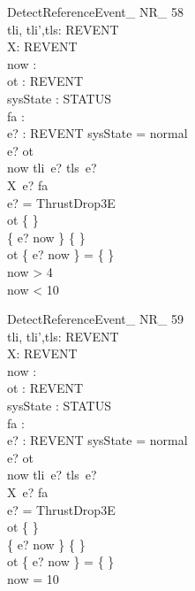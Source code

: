 \begin{schema}{DetectReferenceEvent\_ NR\_ 58}\\
tli, tli',tls: REVENT \fun \nat \\
X: REVENT \fun \nat \\
 now : \nat \\
 ot : REVENT \pfun \nat \\
 sysState : STATUS \\
 fa : \nat \\
 e? : REVENT 
\where
 sysState = normal \\
 e? \notin \dom ot \\
 now \in tli~e? \upto tls~e? \\
 X~e? \geq fa \\
 e? = ThrustDrop3E \\
 ot \neq \{ \} \\
 \{ e? \mapsto now \} \neq \{ \} \\
 ot \cap \{ e? \mapsto now \} = \{ \} \\
 now > 4 \\
 now < 10
\end{schema}


\begin{schema}{DetectReferenceEvent\_ NR\_ 59}\\
tli, tli',tls: REVENT \fun \nat \\
X: REVENT \fun \nat \\
 now : \nat \\
 ot : REVENT \pfun \nat \\
 sysState : STATUS \\
 fa : \nat \\
 e? : REVENT 
\where
 sysState = normal \\
 e? \notin \dom ot \\
 now \in tli~e? \upto tls~e? \\
 X~e? \geq fa \\
 e? = ThrustDrop3E \\
 ot \neq \{ \} \\
 \{ e? \mapsto now \} \neq \{ \} \\
 ot \cap \{ e? \mapsto now \} = \{ \} \\
 now = 10
\end{schema}
